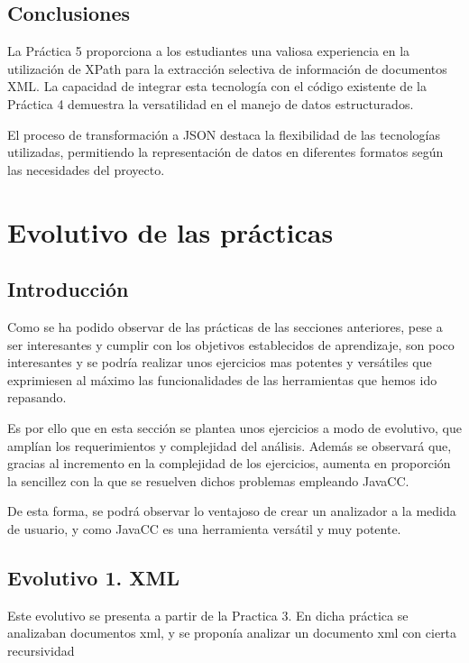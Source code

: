 \subsection{Conclusiones}

\noindent La Práctica 5 proporciona a los estudiantes una valiosa experiencia en la utilización de XPath para la extracción selectiva de información de documentos XML. La capacidad de integrar esta tecnología con el código existente de la Práctica 4 demuestra la versatilidad en el manejo de datos estructurados.

El proceso de transformación a JSON destaca la flexibilidad de las tecnologías utilizadas, permitiendo la representación de datos en diferentes formatos según las necesidades del proyecto.

\section{Evolutivo de las prácticas}

\subsection{Introducción}

\noindent Como se ha podido observar de las prácticas de las secciones anteriores, pese a ser interesantes y cumplir con los objetivos establecidos de aprendizaje, son poco interesantes y se podría realizar unos ejercicios mas potentes y versátiles que exprimiesen al máximo las funcionalidades de las herramientas que hemos ido repasando.

Es por ello que en esta sección se plantea unos ejercicios a modo de evolutivo, que amplían los requerimientos y complejidad del análisis. Además se observará que, gracias al incremento en la complejidad de los ejercicios, aumenta en proporción la sencillez con la que se resuelven dichos problemas empleando JavaCC.

De esta forma, se podrá observar lo ventajoso de crear un analizador a la medida de usuario, y como JavaCC es una herramienta versátil y muy potente.


\subsection{Evolutivo 1. XML}

\noindent Este evolutivo se presenta a partir de la Practica 3. En dicha práctica se analizaban documentos xml, y se proponía analizar un documento xml con cierta recursividad